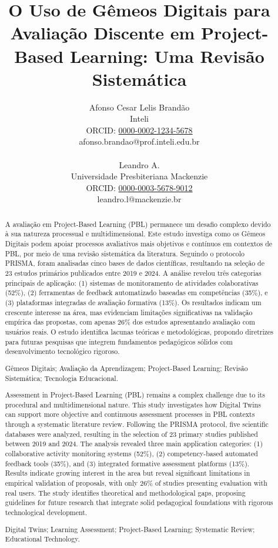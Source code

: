 \documentclass[english, spanish, brazilian]{RBIEarticle} %
\title{O Uso de Gêmeos Digitais para Avaliação Discente em Project-Based Learning: Uma Revisão Sistemática}
\author{%
\parbox{8cm}{%
Afonso Cesar Lelis Brandão\\
Inteli\\
ORCID: \href{https://orcid.org/0000-0002-1234-5678}{0000-0002-1234-5678}\\
afonso.brandao@prof.inteli.edu.br\\\\
Leandro A.\\
Universidade Presbiteriana Mackenzie\\
ORCID: \href{https://orcid.org/0000-0003-5678-9012}{0000-0003-5678-9012}\\
leandro.l@mackenzie.br}}
\begin{document}
\maketitle

\begin{otherlanguage}{brazilian}
\begin{abstract}
A avaliação em Project-Based Learning (PBL) permanece um desafio complexo devido à sua natureza processual e multidimensional. Este estudo investiga como os Gêmeos Digitais podem apoiar processos avaliativos mais objetivos e contínuos em contextos de PBL, por meio de uma revisão sistemática da literatura. Seguindo o protocolo PRISMA, foram analisadas cinco bases de dados científicas, resultando na seleção de 23 estudos primários publicados entre 2019 e 2024. A análise revelou três categorias principais de aplicação: (1) sistemas de monitoramento de atividades colaborativas (52\%), (2) ferramentas de feedback automatizado baseadas em competências (35\%), e (3) plataformas integradas de avaliação formativa (13\%). Os resultados indicam um crescente interesse na área, mas evidenciam limitações significativas na validação empírica das propostas, com apenas 26\% dos estudos apresentando avaliação com usuários reais. O estudo identifica lacunas teóricas e metodológicas, propondo diretrizes para futuras pesquisas que integrem fundamentos pedagógicos sólidos com desenvolvimento tecnológico rigoroso.

\keywords Gêmeos Digitais; Avaliação da Aprendizagem; Project-Based Learning; Revisão Sistemática; Tecnologia Educacional.
\end{abstract}
\end{otherlanguage}

\begin{otherlanguage}{english}
\begin{abstract}
Assessment in Project-Based Learning (PBL) remains a complex challenge due to its procedural and multidimensional nature. This study investigates how Digital Twins can support more objective and continuous assessment processes in PBL contexts through a systematic literature review. Following the PRISMA protocol, five scientific databases were analyzed, resulting in the selection of 23 primary studies published between 2019 and 2024. The analysis revealed three main application categories: (1) collaborative activity monitoring systems (52\%), (2) competency-based automated feedback tools (35\%), and (3) integrated formative assessment platforms (13\%). Results indicate growing interest in the area but reveal significant limitations in empirical validation of proposals, with only 26\% of studies presenting evaluation with real users. The study identifies theoretical and methodological gaps, proposing guidelines for future research that integrate solid pedagogical foundations with rigorous technological development.

\keywords Digital Twins; Learning Assessment; Project-Based Learning; Systematic Review; Educational Technology.
\end{abstract}
\end{otherlanguage}
\end{document}
